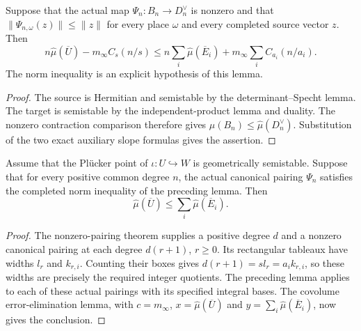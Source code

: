 \begin{lemma}
\label{lem:canonical-pairing-finite-reduction}
\leanok
Suppose that the actual map $\Psi_n:B_n\to D_n^{\vee}$ is nonzero and that
$\|\Psi_{n,\omega}(z)\|\leq\|z\|$ for every place $\omega$ and every completed
source vector $z$. Then
\[
 n\widehat\mu(\overline U)-m_\infty C_s(n/s)
 \leq n\sum_i\widehat\mu(\overline E_i)
       +m_\infty\sum_i C_{a_i}(n/a_i).
\]
The norm inequality is an explicit hypothesis of this lemma.
\end{lemma}
\begin{proof}
The source is Hermitian and semistable by the determinant--Specht lemma.
The target is semistable by the independent-product lemma and duality.
The nonzero contraction comparison therefore gives
$\widehat\mu(B_n)\leq\widehat\mu(D_n^{\vee})$.
Substitution of the two exact auxiliary slope formulas gives the assertion.
\end{proof}

\begin{lemma}
\label{lem:canonical-pairing-limit-reduction}
\leanok
Assume that the Pl\"ucker point of $\iota:U\hookrightarrow W$ is geometrically
semistable. Suppose that for every positive common degree $n$, the actual
canonical pairing $\Psi_n$ satisfies the completed norm inequality of the
preceding lemma. Then
\[
 \widehat\mu(\overline U)\leq\sum_i\widehat\mu(\overline E_i).
\]
\end{lemma}
\begin{proof}
The nonzero-pairing theorem supplies a positive degree $d$ and a nonzero
canonical pairing at each degree $d(r+1)$, $r\geq0$. Its rectangular tableaux
have widths $l_r$ and $k_{r,i}$. Counting their boxes gives
$d(r+1)=s l_r=a_i k_{r,i}$, so these widths are precisely the required
integer quotients. The preceding lemma applies to each of these actual
pairings with its specified integral bases. The covolume error-elimination
lemma, with $c=m_\infty$, $x=\widehat\mu(\overline U)$ and
$y=\sum_i\widehat\mu(\overline E_i)$, now gives the conclusion.
\end{proof}

